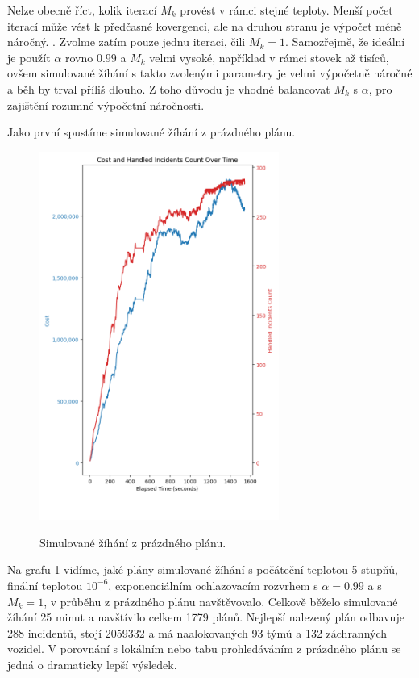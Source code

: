 Nelze obecně říct, kolik iterací $M_k$ provést v rámci stejné teploty. Menší počet iterací může vést k předčasné kovergenci, ale na druhou stranu je výpočet méně náročný. \cite{sa_theory}. 
Zvolme zatím pouze jednu iteraci, čili $M_k = 1$.
Samozřejmě, že ideální je použít $\alpha$ rovno $0.99$ a $M_k$ velmi vysoké, například v rámci stovek až tisíců, 
ovšem simulované žíhání s takto zvolenými parametry je velmi výpočetně náročné a běh by trval příliš dlouho.
Z toho důvodu je vhodné balancovat $M_k$ s $\alpha$, pro zajištění rozumné výpočetní náročnosti.

Jako první spustíme simulované žíhání z prázdného plánu.

\begin{figure}[H]
  \caption{Simulované žíhání z prázdného plánu.}
  \includegraphics[width=0.7\textwidth,height=0.9\textwidth]{img/plots/sa_empty.png}
  \centering
  \label{img:sa_empty}
\end{figure}

Na grafu \ref{img:sa_empty} vidíme, jaké plány simulované žíhání
s počáteční teplotou 5 stupňů, finální teplotou $10^{-6}$, exponenciálním ochlazovacím rozvrhem s $\alpha = 0.99$ a s $M_k = 1$,
v průběhu z prázdného plánu navštěvovalo.
Celkově běželo simulované žíhání 25 minut a navštívilo celkem 1779 plánů.
Nejlepší nalezený plán odbavuje 288 incidentů, stojí 2059332 a má naalokovaných 93 týmů a 132 záchranných vozidel.
V porovnání s lokálním nebo tabu prohledáváním z prázdného plánu se jedná o dramaticky lepší výsledek.

